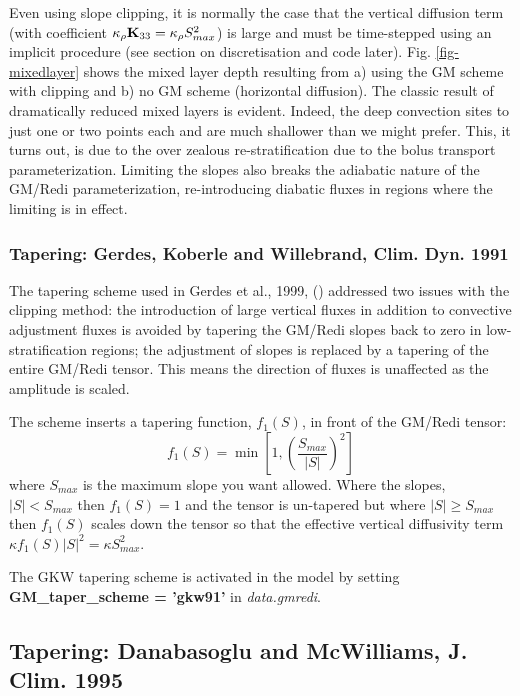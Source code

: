 Even using slope clipping, it is normally the case that the vertical
diffusion term (with coefficient $\kappa_\rho{\bf K}_{33} =
\kappa_\rho S_{max}^2$) is large and must be time-stepped using an
implicit procedure (see section on discretisation and code later).
Fig. \ref{fig-mixedlayer} shows the mixed layer depth resulting from
a) using the GM scheme with clipping and b) no GM scheme (horizontal
diffusion). The classic result of dramatically reduced mixed layers is
evident. Indeed, the deep convection sites to just one or two points
each and are much shallower than we might prefer. This, it turns out,
is due to the over zealous re-stratification due to the bolus transport
parameterization. Limiting the slopes also breaks the adiabatic nature
of the GM/Redi parameterization, re-introducing diabatic fluxes in
regions where the limiting is in effect.

\subsubsection{Tapering: Gerdes, Koberle and Willebrand, Clim. Dyn. 1991}

The tapering scheme used in Gerdes et al., 1999, (\cite{gkw:99})
addressed two issues with the clipping method: the introduction of
large vertical fluxes in addition to convective adjustment fluxes is
avoided by tapering the GM/Redi slopes back to zero in
low-stratification regions; the adjustment of slopes is replaced by a
tapering of the entire GM/Redi tensor. This means the direction of
fluxes is unaffected as the amplitude is scaled.

The scheme inserts a tapering function, $f_1(S)$, in front of the
GM/Redi tensor:
\begin{equation}
f_1(S) = \min \left[ 1, \left( \frac{S_{max}}{|S|}\right)^2 \right]
\end{equation}
where $S_{max}$ is the maximum slope you want allowed. Where the
slopes, $|S|<S_{max}$ then $f_1(S) = 1$ and the tensor is un-tapered
but where $|S| \ge S_{max}$ then $f_1(S)$ scales down the tensor so
that the effective vertical diffusivity term $\kappa f_1(S) |S|^2 =
\kappa S_{max}^2$.

The GKW tapering scheme is activated in the model by setting {\bf
GM\_tap\-er\_scheme = 'gkw91'} in {\em data.gmredi}.

\subsection{Tapering: Danabasoglu and McWilliams, J. Clim. 1995}

